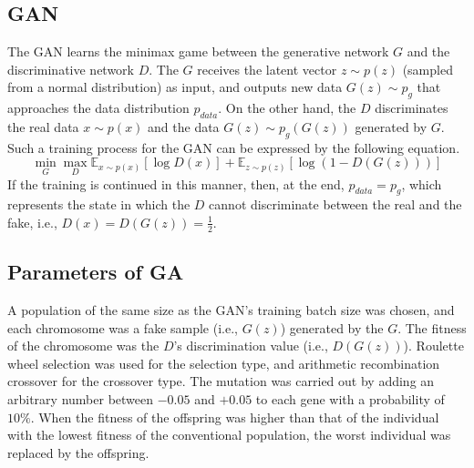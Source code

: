\subsection{GAN}
\label{sec:gan}
The GAN learns the minimax game between the generative network \(G\) and the discriminative network \(D\). The \(G\) receives the latent vector \(z \sim p\left(z\right)\) (sampled from a normal distribution) as input, and outputs new data \(G\left(z\right) \sim p_{g}\) that approaches the data distribution \(p_{data}\). On the other hand, the \(D\) discriminates the real data \(x \sim p\left(x\right)\) and the data \(G\left(z\right) \sim p_{g}\left(G\left(z\right)\right)\) generated by \(G\). Such a training process for the GAN can be expressed by the following equation.
\begin{equation}
    \min\limits_{G} \max\limits_{D} \mathbb{E}_{x \sim p\left(x\right)}\left[\log D\left(x\right)\right] + \mathbb{E}_{z \sim p\left(z\right)}\left[\log \left(1 - D\left(G\left(z\right)\right)\right)\right]
\end{equation}
If the training is continued in this manner, then, at the end, \(p_{data} = p_{g}\), which represents the state in which the \(D\) cannot discriminate between the real and the fake, i.e., \(D\left(x\right) = D\left(G\left(z\right)\right) = \frac{1}{2}\).

\subsection{Parameters of GA}
\label{sec:ga-parameters}
A population of the same size as the GAN’s training batch size was chosen, and each chromosome was a fake sample (i.e., \(G\left(z\right)\)) generated by the \(G\). The fitness of the chromosome was the \(D\)'s discrimination value (i.e., \(D\left(G\left(z\right)\right)\)). Roulette wheel selection was used for the selection type, and arithmetic recombination crossover for the crossover type. The mutation was carried out by adding an arbitrary number between \(-0.05\) and \(+0.05\) to each gene with a probability of \(10\%\). When the fitness of the offspring was higher than that of the individual with the lowest fitness of the conventional population, the worst individual was replaced by the offspring.

